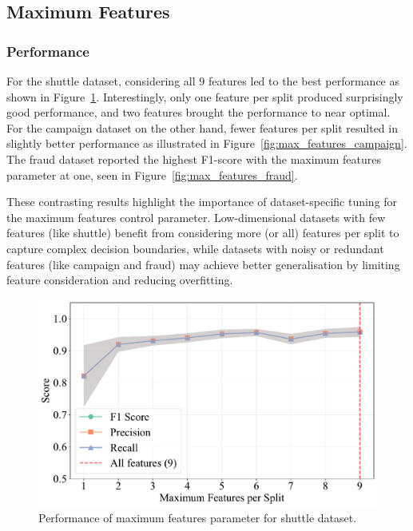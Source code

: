 \documentclass[10pt, conference]{IEEEtran}
\begin{document}
\subsection{Maximum Features}
\subsubsection{Performance}

For the shuttle dataset, considering all 9 features led to the best performance as shown in Figure~\ref{fig:max_features_shuttle}. Interestingly, only one feature per split produced surprisingly good performance, and two features brought the performance to near optimal. For the campaign dataset on the other hand, fewer features per split resulted in slightly better performance as illustrated in Figure~\ref{fig:max_features_campaign}. The fraud dataset reported the highest F1-score with the maximum features parameter at one, seen in Figure~\ref{fig:max_features_fraud}.

These contrasting results highlight the importance of dataset-specific tuning for the maximum features control parameter. Low-dimensional datasets with few features (like shuttle) benefit from considering more (or all) features per split to capture complex decision boundaries, while datasets with noisy or redundant features (like campaign and fraud) may achieve better generalisation by limiting feature consideration and reducing overfitting.


\begin{figure}[H]
	\centering
	\includegraphics[width=0.95\linewidth]{../results/shuttle/max_features/performance_vs_max_features.pdf}
	\caption{Performance of maximum features parameter for shuttle dataset.}
	\label{fig:max_features_shuttle}
\end{figure}
\end{document}
